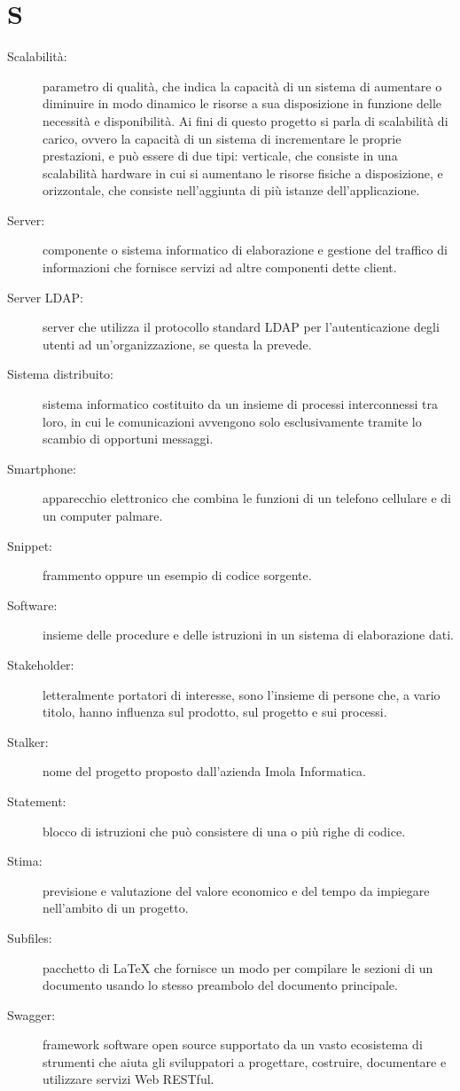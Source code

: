 \documentclass{article}
\begin{document}
	\section{S}
	\begin{description}
		\item[Scalabilità:] parametro di qualità, che indica la capacità di un sistema di aumentare o diminuire in modo dinamico le risorse a sua disposizione in funzione delle necessità e disponibilità. Ai fini di questo progetto si parla di scalabilità di carico, ovvero la capacità di un sistema di incrementare le proprie prestazioni, e può essere di due tipi: verticale, che consiste in una scalabilità hardware in cui si aumentano le risorse fisiche a disposizione, e orizzontale, che consiste nell'aggiunta di più istanze dell'applicazione.
		\item[Server:] componente o sistema informatico di elaborazione e gestione del traffico di informazioni che fornisce servizi ad altre componenti dette client.
		\item[Server LDAP:] server che utilizza il protocollo standard LDAP per l'autenticazione degli utenti ad un'organizzazione, se questa la prevede.
		\item[Sistema distribuito:] sistema informatico costituito da un insieme di processi interconnessi tra loro, in cui le comunicazioni avvengono solo esclusivamente tramite lo scambio di opportuni messaggi.
		\item[Smartphone:] apparecchio elettronico che combina le funzioni di un telefono cellulare e di un computer palmare.
		\item[Snippet:] frammento oppure un esempio di codice sorgente.
		\item[Software:] insieme delle procedure e delle istruzioni in un sistema di elaborazione dati.
		\item[Stakeholder:] letteralmente portatori di interesse, sono l’insieme di persone che, a vario titolo, hanno influenza sul prodotto, sul progetto e sui processi.
		\item[Stalker:] nome del progetto proposto dall'azienda Imola Informatica.
		\item[Statement:] blocco di istruzioni che può consistere di una o più righe di codice.
		\item[Stima:] previsione e valutazione del valore economico e del tempo da impiegare nell'ambito di un progetto.
		\item[Subfiles:] pacchetto di LaTeX che fornisce un modo per compilare le sezioni di un documento usando lo stesso preambolo del documento principale.
		\item[Swagger:] framework software open source supportato da un vasto ecosistema di strumenti che aiuta gli sviluppatori a progettare, costruire, documentare e utilizzare servizi Web RESTful.

	\end{description}
	\newpage
\end{document}
